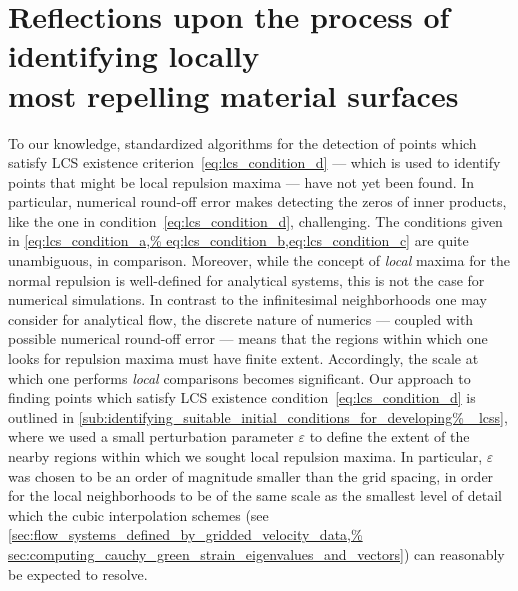 \section[Reflections upon the process of identifying locally most
repelling material surfaces]
{Reflections upon the process of identifying locally \\\phantom{5.3} most
repelling material surfaces}
\label{sec:reflections_on_the_process_of_identifying_locally_most_normally%
_repelling_material_surfaces}

To our knowledge, standardized algorithms for the detection of points which
satisfy LCS existence criterion~\eqref{eq:lcs_condition_d} --- which is used to
identify points that might be local repulsion maxima --- have not yet been
found. In particular, numerical round-off error makes detecting the zeros of
inner products, like the one in condition~\eqref{eq:lcs_condition_d},
challenging. The conditions given in \cref{eq:lcs_condition_a,%
eq:lcs_condition_b,eq:lcs_condition_c} are quite unambiguous, in comparison.
Moreover, while the concept of \emph{local} maxima for the normal repulsion is
well-defined for analytical systems, this is not the case for numerical
simulations. In contrast to the infinitesimal neighborhoods one may consider
for analytical flow, the discrete nature of numerics --- coupled with possible
numerical round-off error --- means that the regions within which one looks for
repulsion maxima must have finite extent. Accordingly, the scale at which one
performs \emph{local} comparisons becomes significant. Our approach to finding
points which satisfy LCS existence condition~\eqref{eq:lcs_condition_d} is
outlined in \cref{sub:identifying_suitable_initial_conditions_for_developing%
_lcss}, where we used a small perturbation parameter $\varepsilon$ to define
the extent of  the nearby regions within which we sought local repulsion
maxima. In particular, $\varepsilon$ was chosen to be an order of magnitude
smaller than the grid spacing, in order for the local neighborhoods to be of
the same scale as the smallest level of detail which the cubic interpolation
schemes (see \cref{sec:flow_systems_defined_by_gridded_velocity_data,%
sec:computing_cauchy_green_strain_eigenvalues_and_vectors}) can reasonably
be expected to resolve.

